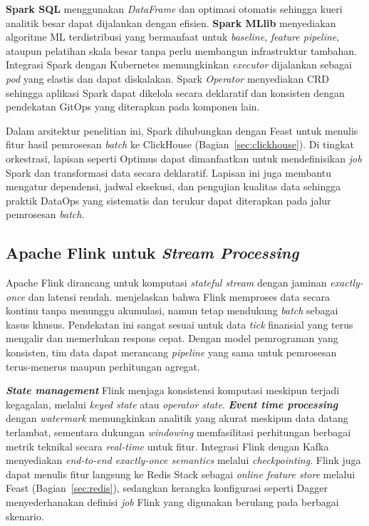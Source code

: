 \textbf{Spark SQL} menggunakan \textit{DataFrame} dan optimasi otomatis sehingga kueri analitik besar dapat dijalankan dengan efisien. \textbf{Spark MLlib} menyediakan algoritme ML terdistribusi yang bermanfaat untuk \textit{baseline}, \textit{feature pipeline}, ataupun pelatihan skala besar tanpa perlu membangun infrastruktur tambahan. Integrasi Spark dengan Kubernetes memungkinkan \textit{executor} dijalankan sebagai \textit{pod} yang elastis dan dapat diskalakan. Spark \textit{Operator} menyediakan CRD sehingga aplikasi Spark dapat dikelola secara deklaratif dan konsisten dengan pendekatan GitOps yang diterapkan pada komponen lain.

Dalam arsitektur penelitian ini, Spark dihubungkan dengan Feast untuk menulis fitur hasil pemrosesan \textit{batch} ke ClickHouse (Bagian~\ref{sec:clickhouse}). Di tingkat orkestrasi, lapisan seperti Optimus \autocite{raystack2025optimus} dapat dimanfaatkan untuk mendefinisikan \textit{job} Spark dan transformasi data secara deklaratif. Lapisan ini juga membantu mengatur dependensi, jadwal eksekusi, dan pengujian kualitas data sehingga praktik DataOps yang sistematis dan terukur dapat diterapkan pada jalur pemrosesan \textit{batch}.

\subsection{Apache Flink untuk \textit{Stream Processing}}
\label{sec:flink}

Apache Flink dirancang untuk komputasi \textit{stateful stream} dengan jaminan \textit{exactly-once} dan latensi rendah. \textcite{carbone2015apache} menjelaskan bahwa Flink memproses data secara kontinu tanpa menunggu akumulasi, namun tetap mendukung \textit{batch} sebagai kasus khusus. Pendekatan ini sangat sesuai untuk data \textit{tick} finansial yang terus mengalir dan memerlukan respons cepat. Dengan model pemrograman yang konsisten, tim data dapat merancang \textit{pipeline} yang sama untuk pemrosesan terus-menerus maupun perhitungan agregat.

\textbf{\textit{State management}} Flink menjaga konsistensi komputasi meskipun terjadi kegagalan, melalui \textit{keyed state} atau \textit{operator state}. \textbf{\textit{Event time processing}} dengan \textit{watermark} memungkinkan analitik yang akurat meskipun data datang terlambat, sementara dukungan \textit{windowing} memfasilitasi perhitungan berbagai metrik teknikal secara \textit{real-time} untuk fitur. Integrasi Flink dengan Kafka menyediakan \textit{end-to-end exactly-once semantics} melalui \textit{checkpointing}. Flink juga dapat menulis fitur langsung ke Redis Stack sebagai \textit{online feature store} melalui Feast (Bagian~\ref{sec:redis}), sedangkan kerangka konfigurasi seperti Dagger \autocite{raystack2025dagger} menyederhanakan definisi \textit{job} Flink yang digunakan berulang pada berbagai skenario.

